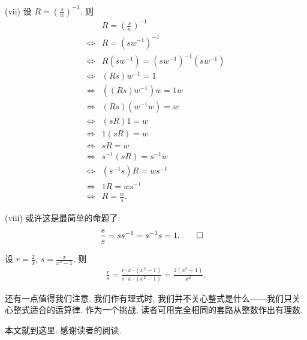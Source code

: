 \begin{pf}
    (vii) 设 $R = \left( \frac{s}{w} \right)^{-1}$. 则
    \begin{align*}
                & R = \left( \frac{s}{w} \right)^{-1}                \\
        \iff {} & R = \left( sw^{-1} \right)^{-1}                    \\
        \iff {} & R(sw^{-1}) = \left( sw^{-1} \right)^{-1} (sw^{-1}) \\
        \iff {} & (Rs)w^{-1} = 1                                     \\
        \iff {} & ((Rs)w^{-1})w = 1w                                 \\
        \iff {} & (Rs)(w^{-1}w) = w                                  \\
        \iff {} & (sR)1 = w                                          \\
        \iff {} & 1(sR) = w                                          \\
        \iff {} & sR = w                                             \\
        \iff {} & s^{-1} (sR) = s^{-1} w                             \\
        \iff {} & (s^{-1} s)R = ws^{-1}                              \\
        \iff {} & 1R = ws^{-1}                                       \\
        \iff {} & R = \frac{w}{s}.
    \end{align*}

    (viii) 或许这是最简单的命题了:
    \begin{align*}
         & \frac{s}{s} = ss^{-1} = s^{-1}s = 1. \qedhere
    \end{align*}
\end{pf}

\begin{example}
    设 $r = \frac{2}{x}$, $s = \frac{x}{x^2 - 1}$. 则
    \begin{align*}
        \frac{r}{s} = \frac{r \cdot x \cdot (x^2 - 1)}{s \cdot x \cdot (x^2 - 1)} = \frac{2(x^2 - 1)}{x^2}.
    \end{align*}
\end{example}

还有一点值得我们注意. 我们作有理式时, 我们并不关心整式是什么——我们只关心整式适合的运算律. 作为一个挑战, 读者可用完全相同的套路从整数作出有理数.

本文就到这里. 感谢读者的阅读.
